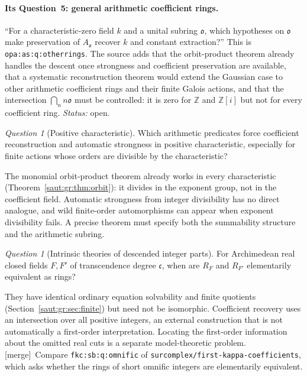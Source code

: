 \documentclass[11pt]{article}
\theoremstyle{definition}
\theoremstyle{remark}
\newtheorem{question}[theorem]{Question}
\newcommand{\Z}{\mathbb Z}
\newcommand{\repo}[1]{\nolinkurl{#1}}%
\newcommand{\lbl}[1]{\nolinkurl{#1}}%
\newcommand{\cc}{\mathfrak c}
\newcommand{\mergetag}{\textup{[merge]}}
\numberwithin{equation}{section}
\begin{document}
\paragraph{Its Question~5: general arithmetic coefficient rings.} ``For a
characteristic-zero field $k$ and a unital subring $\mathfrak o$, which hypotheses on
$\mathfrak o$ make preservation of $A_{\mathfrak o}$ recover $k$ and constant extraction?''
This is \lbl{opa:as:q:otherrings}. The source adds that the orbit-product theorem already
handles the descent once strongness and coefficient preservation are available, that a
systematic reconstruction theorem would extend the Gaussian case to other arithmetic
coefficient rings and their finite Galois actions, and that the intersection
$\bigcap_nn\mathfrak o$ must be controlled: it is zero for $\Z$ and $\Z[i]$ but not for
every coefficient ring. \emph{Status:} open.

\begin{question}[Positive characteristic]\label{saut:gr:q:charp}
Which arithmetic predicates force coefficient reconstruction and automatic strongness
in positive characteristic, especially for finite actions whose orders are divisible by
the characteristic?
\end{question}
The monomial orbit-product theorem already works in every characteristic
(Theorem~\ref{saut:gr:thm:orbit}): it divides in the exponent group, not in the
coefficient field. Automatic strongness from integer divisibility has no direct
analogue, and wild finite-order automorphisms can appear when exponent divisibility
fails. A precise theorem must specify both the summability structure and the arithmetic
subring.

\begin{question}[Intrinsic theories of descended integer parts]\label{saut:gr:q:theories}
For Archimedean real closed fields $F,F'$ of transcendence degree $\cc$, when are $R_F$
and $R_{F'}$ elementarily equivalent as rings?
\end{question}
They have identical ordinary equation solvability and finite quotients
(Section~\ref{saut:gr:sec:finite}) but need not be isomorphic. Coefficient recovery uses
an intersection over all positive integers, an external construction that is not
automatically a first-order interpretation. Locating the first-order information about
the omitted real cuts is a separate model-theoretic problem. \mergetag\ Compare
\lbl{fkc:sb:q:omnific} of \repo{surcomplex/first-kappa-coefficients}, which asks whether
the rings of short omnific integers are elementarily equivalent.
\end{document}
